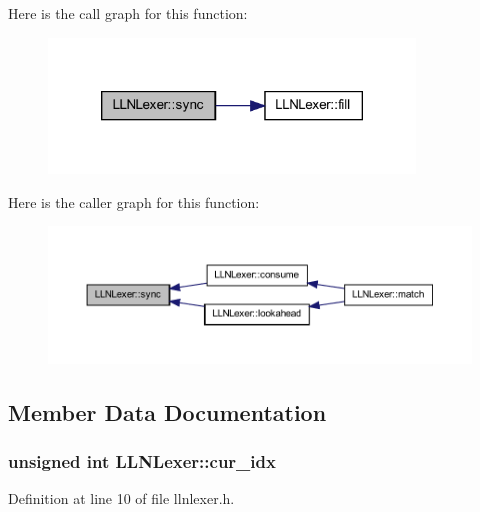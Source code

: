 Here is the call graph for this function:\nopagebreak
\begin{figure}[H]
\begin{center}
\leavevmode
\includegraphics[width=276pt]{class_l_l_n_lexer_a63acbcfa3e703992774a6071a49d1735_cgraph}
\end{center}
\end{figure}




Here is the caller graph for this function:\nopagebreak
\begin{figure}[H]
\begin{center}
\leavevmode
\includegraphics[width=400pt]{class_l_l_n_lexer_a63acbcfa3e703992774a6071a49d1735_icgraph}
\end{center}
\end{figure}




\subsection{Member Data Documentation}
\hypertarget{class_l_l_n_lexer_a6cac67fbdbdc8083f87e1d0938d68ba2}{
\subsubsection[{cur\_\-idx}]{\setlength{\rightskip}{0pt plus 5cm}unsigned int {\bf LLNLexer::cur\_\-idx}}}
\label{class_l_l_n_lexer_a6cac67fbdbdc8083f87e1d0938d68ba2}


Definition at line 10 of file llnlexer.h.

